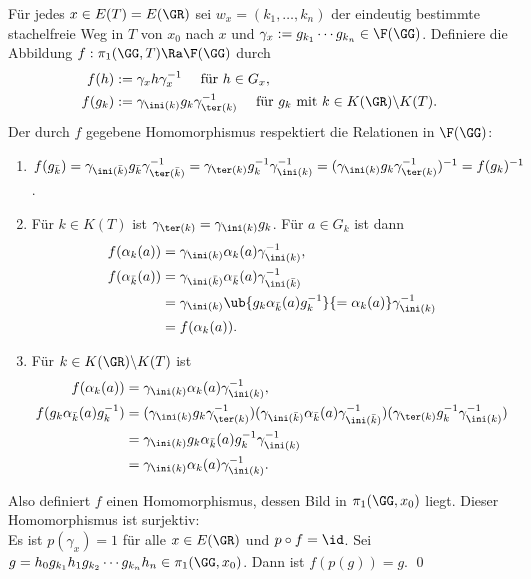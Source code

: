 \bew Für jedes $x\in E(T)=E(\GR)$ sei $w_x=(k_1,\ldots,k_n)$
der eindeutig bestimmte stachelfreie Weg in $T$ von $x_0$ nach $x$
und $\gamma_x:=g_{k_1}\cdots g_{k_n}\in\F(\GG)$.
Definiere die Abbildung $f:\pi_1(\GG,T)\Ra\F(\GG)$ durch
\begin{align*}
f(h) &:= \gamma_x h \gamma_x^{-1}\quad \text{ für } h\in G_x, \\
f(g_k) &:= \gamma_{\ini(k)} g_k \gamma_{\ter(k)}^{-1}
\quad \text{ für } g_k \text{ mit } k\in K(\GR)\backslash K(T).
\end{align*}
Der durch $f$ gegebene Homomorphismus respektiert die
Relationen in $\F(\GG)$:
\begin{enumerate}
\item $f(g_{\bar{k}})
=\gamma_{\ini(\bar{k})} g_{\bar{k}} \gamma_{\ter(\bar{k})}^{-1}
=\gamma_{\ter(k)} g_k^{-1}\gamma_{\ini(k)}^{-1}
=(\gamma_{\ini(k)} g_k \gamma_{\ter(k)}^{-1})^{-1}
=f(g_k)^{-1}$.
\item Für $k\in K(T)$ ist $\gamma_{\ter(k)}=\gamma_{\ini(k)} g_k$.
Für $a\in G_k$ ist dann
\begin{align*}
f(\alpha_k(a)) &= \gamma_{\ini(k)} \alpha_k(a) \gamma_{\ini(k)}^{-1}, \\
f(\alpha_{\bar{k}}(a))
&= \gamma_{\ini(\bar{k})} \alpha_{\bar{k}}(a) \gamma_{\ini(\bar{k})}^{-1} \\
&= \gamma_{\ini(k)} \ub{g_k \alpha_{\bar{k}}(a) g_k^{-1}}{=\alpha_k(a)} \gamma_{\ini(k)}^{-1} \\
&= f(\alpha_k(a)).
\end{align*}
\item Für $k\in K(\GR)\backslash K(T)$ ist
\begin{align*}
f(\alpha_k(a)) &= \gamma_{\ini(k)} \alpha_k(a) \gamma_{\ini(k)}^{-1}, \\
f(g_k \alpha_{\bar{k}}(a) g_k^{-1})
&= (\gamma_{\ini(k)}g_k \gamma_{\ter(k)}^{-1})
(\gamma_{\ini(\bar{k})}\alpha_{\bar{k}}(a)\gamma_{\ini(\bar{k})}^{-1})
(\gamma_{\ter(k)}g_k^{-1}\gamma_{\ini(k)}^{-1})\\
&= \gamma_{\ini(k)} g_k \alpha_{\bar{k}}(a) g_k^{-1}\gamma_{\ini(k)}^{-1} \\
&= \gamma_{\ini(k)}\alpha_{k}(a)\gamma_{\ini(k)}^{-1}.
\end{align*}
\end{enumerate}
Also definiert $f$ einen Homomorphismus, dessen Bild in
$\pi_1(\GG,x_0)$ liegt. Dieser Homomorphismus ist surjektiv:\\
Es ist $p(\gamma_x)=1$ für alle $x\in E(\GR)$ und $p\circ f=\id$.
Sei $g=h_0 g_{k_1} h_1 g_{k_2} \cdots g_{k_n} h_n\in\pi_1(\GG,x_0)$.
Dann ist
$f(p(g))=g$.
\qed

